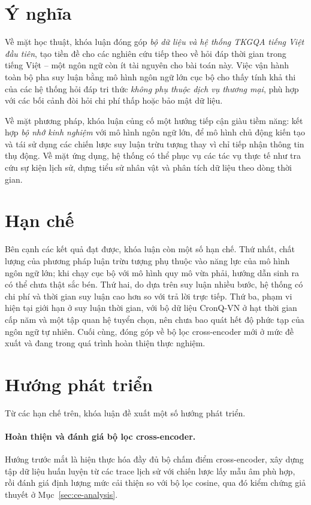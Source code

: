 \section{Ý nghĩa}
\label{sec:significance}

Về mặt học thuật, khóa luận đóng góp \emph{bộ dữ liệu và hệ thống TKGQA tiếng Việt đầu tiên}, tạo
tiền đề cho các nghiên cứu tiếp theo về hỏi đáp thời gian trong tiếng Việt -- một ngôn ngữ còn ít
tài nguyên cho bài toán này. Việc vận hành toàn bộ pha suy luận bằng mô hình ngôn ngữ lớn cục bộ cho
thấy tính khả thi của các hệ thống hỏi đáp tri thức \emph{không phụ thuộc dịch vụ thương mại}, phù
hợp với các bối cảnh đòi hỏi chi phí thấp hoặc bảo mật dữ liệu.

Về mặt phương pháp, khóa luận củng cố một hướng tiếp cận giàu tiềm năng: kết hợp \emph{bộ nhớ kinh
nghiệm} với mô hình ngôn ngữ lớn, để mô hình chủ động kiến tạo và tái sử dụng các chiến lược suy
luận trừu tượng thay vì chỉ tiếp nhận thông tin thụ động. Về mặt ứng dụng, hệ thống có thể phục vụ
các tác vụ thực tế như tra cứu sự kiện lịch sử, dựng tiểu sử nhân vật và phân tích dữ liệu theo dòng
thời gian.

\section{Hạn chế}
\label{sec:limitations}

Bên cạnh các kết quả đạt được, khóa luận còn một số hạn chế. Thứ nhất, chất lượng của phương pháp
luận trừu tượng phụ thuộc vào năng lực của mô hình ngôn ngữ lớn; khi chạy cục bộ với mô hình quy mô
vừa phải, hướng dẫn sinh ra có thể chưa thật sắc bén. Thứ hai, do dựa trên suy luận nhiều bước, hệ
thống có chi phí và thời gian suy luận cao hơn so với trả lời trực tiếp. Thứ ba, phạm vi hiện tại
giới hạn ở suy luận thời gian, với bộ dữ liệu CronQ-VN ở hạt thời gian cấp năm và một tập quan hệ
tuyển chọn, nên chưa bao quát hết độ phức tạp của ngôn ngữ tự nhiên. Cuối cùng, đóng góp về bộ lọc
cross-encoder mới ở mức đề xuất và đang trong quá trình hoàn thiện thực nghiệm.

\section{Hướng phát triển}
\label{sec:future}

Từ các hạn chế trên, khóa luận đề xuất một số hướng phát triển.

\paragraph{Hoàn thiện và đánh giá bộ lọc cross-encoder.} Hướng trước mắt là hiện thực hóa đầy đủ bộ
chấm điểm cross-encoder, xây dựng tập dữ liệu huấn luyện từ các trace lịch sử với chiến lược lấy mẫu
âm phù hợp, rồi đánh giá định lượng mức cải thiện so với bộ lọc cosine, qua đó kiểm chứng giả thuyết
ở Mục~\ref{sec:ce-analysis}.

